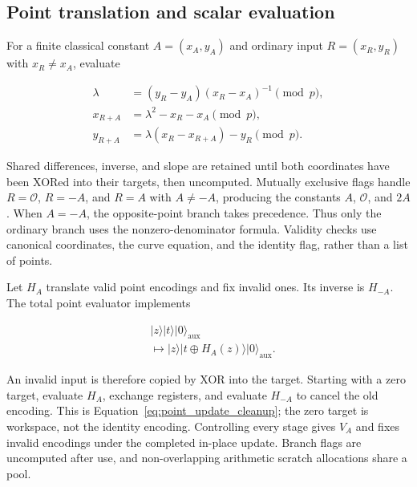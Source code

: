 \begin{revision}
\subsection{Point translation and scalar evaluation}

For a finite classical constant $A=(x_A,y_A)$ and ordinary input $R=(x_R,y_R)$ with $x_R\neq x_A$, evaluate 

\begin{equation}
    \label{eq:affine_translation}
    \begin{aligned}
        \lambda&=(y_R-y_A)(x_R-x_A)^{-1}\pmod p,\\
        x_{R+A}&=\lambda^2-x_R-x_A\pmod p,\\
        y_{R+A}&=\lambda(x_R-x_{R+A})-y_R\pmod p.
    \end{aligned}
\end{equation}

Shared differences, inverse, and slope are retained until both coordinates have been XORed into their targets, then uncomputed. Mutually exclusive flags handle $R=\mathcal O$, $R=-A$, and $R=A$ with $A\neq-A$, producing the constants $A$, $\mathcal O$, and $2A$. When $A=-A$, the opposite-point branch takes precedence. Thus only the ordinary branch uses the nonzero-denominator formula. Validity checks use canonical coordinates, the curve equation, and the identity flag, rather than a list of points.

Let $H_A$ translate valid point encodings and fix invalid ones. Its inverse is $H_{-A}$. The total point evaluator implements

\begin{equation}
    \label{eq:app_r5_total_point_evaluator}
    \begin{aligned}
        &\lvert z\rangle\lvert t\rangle\lvert0\rangle_{\mathrm{aux}}\\
        &\longmapsto\lvert z\rangle\lvert t\oplus H_A(z)\rangle
         \lvert0\rangle_{\mathrm{aux}}.
    \end{aligned}
\end{equation}

An invalid input is therefore copied by XOR into the target. Starting with a zero target, evaluate $H_A$, exchange registers, and evaluate $H_{-A}$ to cancel the old encoding. This is Equation~\eqref{eq:point_update_cleanup}; the zero target is workspace, not the identity encoding. Controlling every stage gives $V_A$ and fixes invalid encodings under the completed in-place update. Branch flags are uncomputed after use, and non-overlapping arithmetic scratch allocations share a pool.


\end{revision}
